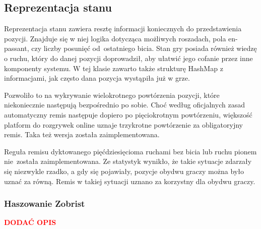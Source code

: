 \subsection{Reprezentacja stanu}
\label{subsec:reprezentacja-stanu}

Reprezentacja stanu zawiera resztę informacji koniecznych do przedstawienia pozycji.
Znajduje się w niej logika dotycząca możliwych roszadach, pola en-passant, czy liczby posunięć od~ostatniego bicia.
Stan gry posiada również wiedzę o ruchu, który do danej pozycji doprowadził, aby ułatwić jego cofanie przez inne komponenty systemu.
W tej klasie zawarto także strukturę HashMap z informacjami, jak często dana pozycja wystąpiła już w grze.

Pozwoliło to na wykrywanie wielokrotnego powtórzenia pozycji, które niekoniecznie następują bezpośrednio po sobie.
Choć według oficjalnych zasad automatyczny remis następuje dopiero po pięciokrotnym powtórzeniu, większość platform do rozgrywek online uznaje trzykrotne powtórzenie za obligatoryjny remis.
Taka też wersja została zaimplementowana.

Reguła remisu dyktowanego pięćdziesięcioma ruchami bez bicia lub ruchu pionem nie~została zaimplementowana.
Ze statystyk wynikło, że takie sytuacje zdarzały się niezwykle rzadko, a gdy się pojawiały, pozycje obydwu graczy można było uznać za równą.
Remis w takiej sytuacji uznano za korzystny dla obydwu graczy.

\subsubsection{Haszowanie Zobrist}

\begin{center}
    \textcolor{red}{\textbf{DODAĆ OPIS}}
\end{center}



